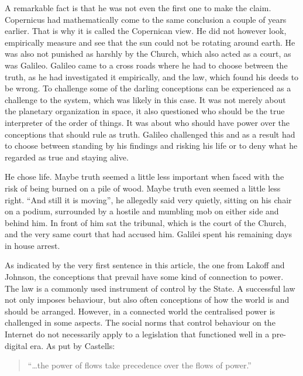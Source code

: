 A remarkable fact is that he was not even the f\hbox{}irst one to make the claim.
Copernicus had mathematically come to the same conclusion a couple of years
earlier. That is why it is called the Copernican view. He did not however look,
empirically measure and see that the sun could not be rotating around earth. He
was also not punished as harshly by the Church, which also acted as a court, as
was Galileo. Galileo came to a cross roads where he had to choose between the
truth, as he had investigated it empirically, and the law, which found his deeds
to be wrong. To challenge some of the darling conceptions can be experienced as
a challenge to the system, which was likely in this case. It was not merely
about the planetary organization in space, it also questioned who should be the
true interpreter of the order of things. It was about who should have power over
the conceptions that should rule as truth. Galileo challenged this and as a
result had to choose between standing by his f\hbox{}indings and risking his life or to
deny what he regarded as true and staying alive.

He chose life. Maybe truth seemed a little less important when faced with the
risk of being burned on a pile of wood. Maybe truth even seemed a little less
right. ``And still it is moving'', he allegedly said very quietly, sitting on
his chair on a podium, surrounded by a hostile and mumbling mob on either side
and behind him. In front of him sat the tribunal, which is the court of the
Church, and the very same court that had accused him. Galilei spent his
remaining days in house arrest.

As indicated by the very f\hbox{}irst sentence in this article, the one from Lakof\hbox{}f and
Johnson, the conceptions that prevail have some kind of connection to power. The
law is a commonly used instrument of control by the State. A successful law not
only imposes behaviour, but also often conceptions of how the world is and
should be arranged. However, in a connected world the centralised power is
challenged in some aspects. The social norms that control behaviour on the
Internet do not necessarily apply to a legislation that functioned well in a
pre-digital era. As put by Castells:

\begin{quote}
``\ldots the power of f\hbox{}lows take precedence over the f\hbox{}lows of
power.''\cite{darling-castells00}
\end{quote}

